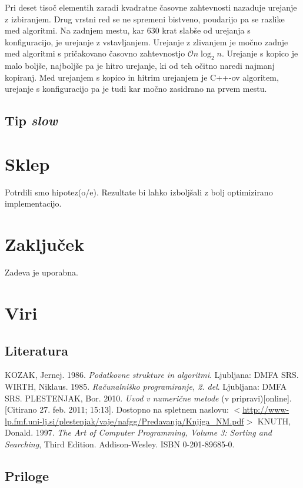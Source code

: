 \documentclass[a4paper,oneside,12pt]{article}
\begin{document}
Pri deset tisoč elementih zaradi kvadratne časovne zahtevnosti nazaduje urejanje
z izbiranjem. Drug vrstni red se ne spremeni bistveno, poudarijo pa se
razlike med algoritmi. Na zadnjem mestu, kar 630 krat slabše od urejanja s
konfiguracijo, je urejanje z vstavljanjem. Urejanje z zlivanjem je močno zadnje
med algoritmi s pričakovano časovno zahtevnostjo $\mathcal{O}n\log_2
n$. Urejanje s kopico je malo boljše, najboljše pa je hitro urejanje, ki od teh
očitno naredi najmanj kopiranj. Med urejanjem s kopico in hitrim urejanjem je
C++-ov algoritem, urejanje s konfiguracijo pa je tudi kar močno zasidrano na
prvem mestu.

\subsection{Tip \emph{slow}}


\section{Sklep}
Potrdili smo hipotez(o/e). Rezultate bi lahko izboljšali z bolj optimizirano implementacijo.
\section{Zaključek}
Zadeva je uporabna.
\section{Viri}
\subsection{Literatura}
\vspace{-1cm}
\begin{thebibliography}{99}
   {KOZAK, Jernej. 1986. \emph{Podatkovne strukture in algoritmi}. Ljubljana: DMFA SRS. }
   {WIRTH, Niklaus. 1985. \emph{Računalniško programiranje, 2. del}. Ljubljana: DMFA SRS. }
   {PLESTENJAK, Bor. 2010. \emph{Uvod v numerične metode} (v pripravi)[online]. [Citirano 27. feb. 2011; 15:13].
    Dostopno na spletnem naslovu: $<$\url{http://www-lp.fmf.uni-lj.si/plestenjak/vaje/nafgg/Predavanja/Knjiga_NM.pdf}$>$}
   {KNUTH, Donald. 1997. \emph{The Art of Computer Programming, Volume 3: Sorting and
    Searching}, Third Edition. Addison-Wesley. ISBN 0-201-89685-0.}
\end{thebibliography}
\subsection{Priloge}
\end{document}

